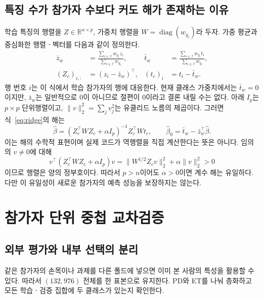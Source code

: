 \documentclass[11pt,a4paper]{article}
\newcommand{\R}{\mathbb{R}}
\DeclareMathOperator{\diag}{diag}
\numberwithin{equation}{section}
\begin{document}
\subsection{특징 수가 참가자 수보다 커도 해가 존재하는 이유}
학습 특징의 행렬을 \(Z\in\R^{n\times p}\),
가중치 행렬을 \(W=\diag(w_{y_i})\)라 두자.
가중 평균과 중심화한 행렬ㆍ벡터를 다음과 같이 정의한다.
\begin{align}
 \bar z_w&=\frac{\sum_{i\in\mathcal I}w_{y_i}z_i}
                  {\sum_{i\in\mathcal I}w_{y_i}},&
 \bar t_w&=\frac{\sum_{i\in\mathcal I}w_{y_i}t_i}
                  {\sum_{i\in\mathcal I}w_{y_i}},\\
 (Z_c)_{i,:}&=(z_i-\bar z_w)^\top,&
 (t_c)_i&=t_i-\bar t_w.
\end{align}
행 번호 \(i\)는 이 식에서 학습 참가자의 행에 대응한다.
현재 클래스 가중치에서는 \(\bar t_w=0\)이지만,
\(\bar z_w\)는 일반적으로 \(0\)이 아니므로 절편이 \(0\)이라고 결론 내릴 수는 없다.
아래 \(I_p\)는 \(p\times p\) 단위행렬이고,
\(\|v\|_2^2=\sum_jv_j^2\)는 유클리드 노름의 제곱이다.
그러면 식~\eqref{eq:ridge}의 해는
\begin{equation}
 \widehat\beta=(Z_c^\top WZ_c+\alpha I_p)^{-1}Z_c^\top Wt_c,\qquad
 \widehat\beta_0=\bar t_w-\bar z_w^\top\widehat\beta.
\end{equation}
이는 해의 수학적 표현이며 실제 코드가 역행렬을 직접 계산한다는 뜻은 아니다.
임의의 \(v\neq0\)에 대해
\begin{equation}
 v^\top(Z_c^\top WZ_c+\alpha I_p)v
 =\|W^{1/2}Z_cv\|_2^2+\alpha\|v\|_2^2>0
\end{equation}
이므로 행렬은 양의 정부호이다.
따라서 \(p>n\)이어도 \(\alpha>0\)이면 계수 해는 유일하다.
다만 이 유일성이 새로운 참가자의 예측 성능을 보장하지는 않는다.

\section{참가자 단위 중첩 교차검증}
\subsection{외부 평가와 내부 선택의 분리}
같은 참가자의 손목이나 과제를 다른 폴드에 넣으면 이미 본 사람의 특성을
활용할 수 있다. 따라서 \((132,976)\) 전체를 한 표본으로 유지한다.
PD와 ET를 나눠 층화하고 모든 학습ㆍ검증 집합에 두 클래스가 있는지 확인한다.
\end{document}
